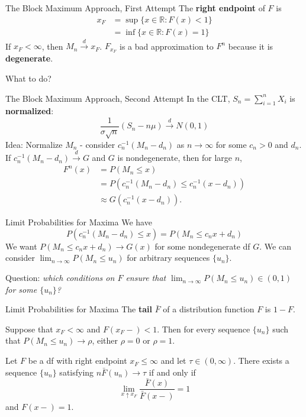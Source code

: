 \documentclass{beamer}
\begin{document}
\begin{frame}{The Block Maximum Approach, First Attempt}
    The \textbf{right endpoint} of $F$ is
    \begin{align*}
    x_F &= \sup\{x \in \mathbb{R} : F(x) < 1\} \\
    &= \inf\{x \in \mathbb{R} : F(x) = 1\}
    \end{align*}
    If $x_F < \infty$, then $M_n \xrightarrow{d} x_F$. $F_{x_F}$ is a bad approximation to $F^n$ because it is \textbf{degenerate}.

    \bigskip

    What to do?
\end{frame}

\begin{frame}{The Block Maximum Approach, Second Attempt}
    In the CLT, $S_n = \sum_{i = 1}^n X_i$ is \textbf{normalized}:
    \[
    \frac{1}{\sigma\sqrt{n}}(S_n - n\mu) \xrightarrow{d} N(0, 1)
    \]
    Idea: Normalize $M_n$ - consider $c_n^{-1}(M_n - d_n)$ as $n \to \infty$ for some $c_n > 0$ and $d_n$. If $c_n^{-1}(M_n - d_n) \xrightarrow{d} G$ and $G$ is nondegenerate, then for large $n$,
    \begin{align*}
        F^n(x) &= P(M_n \le x) \\
        &= P(c_n^{-1}(M_n - d_n) \le c_n^{-1}(x - d_n)) \\
        &\approx G(c_n^{-1}(x - d_n)).
    \end{align*}
\end{frame}

\begin{frame}{Limit Probabilities for Maxima}
    We have
    \[
    P(c_n^{-1}(M_n - d_n) \le x) = P(M_n \le c_n x + d_n)
    \]
    We want $P(M_n \le c_n x + d_n) \to G(x)$ for some nondegenerate df $G$. We can consider $\lim_{n \to \infty} P(M_n \le u_n)$ for arbitrary sequences $\{u_n\}$.
    
    \bigskip
    
    Question: \textit{which conditions on $F$ ensure that $\lim_{n \to \infty} P(M_n \le u_n) \in (0, 1)$ for some $\{u_n\}$?}
\end{frame}

\begin{frame}{Limit Probabilities for Maxima}
    The \textbf{tail} $\bar{F}$ of a distribution function $F$ is $1 - F$.
    \begin{corollary}[3.1.2]
        Suppose that $x_F < \infty$ and $F(x_F-) < 1$. Then for every sequence $\{u_n\}$ such that $P(M_n \le u_n) \to \rho$, either $\rho = 0$ or $\rho = 1$.
    \end{corollary}
    \begin{theorem}[3.1.3]
        Let $F$ be a df with right endpoint $x_F \le \infty$ and let $\tau \in (0, \infty)$. There exists a sequence $\{u_n\}$ satisfying $n\bar{F}(u_n) \to \tau$ if and only if
        \[
        \lim_{x \uparrow x_F} \frac{\bar{F}(x)}{\bar{F}(x-)} = 1
        \]
        and $F(x-) = 1$.
    \end{theorem}
\end{frame}
\end{document}
